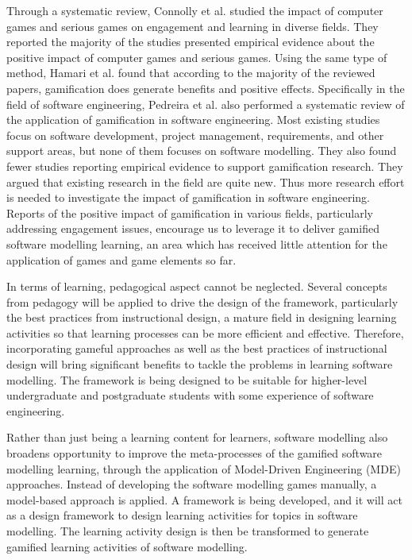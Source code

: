 \documentclass[12pt, a4paper]{report} \usepackage[titletoc]{appendix}
\begin{document}
Through a systematic review, Connolly et al. \cite{connolly2012systematic} studied the impact of computer games and serious games on engagement and learning in diverse fields. They reported the majority of the studies presented empirical evidence about the positive impact of computer games and serious games. Using the same type of method, Hamari et al. \cite{hamari2014does} found that according to the majority of the reviewed papers, gamification does generate benefits and positive effects. Specifically in the field of software engineering, Pedreira et al. \cite{Pedreira2015} also performed a systematic review of the application of gamification in software engineering. Most existing studies focus on software development, project management, requirements, and other support areas, but none of them focuses on software modelling. They also found fewer studies reporting empirical evidence to support gamification research. They argued that existing research in the field are quite new. Thus more research effort is needed to investigate the impact of gamification in software engineering. Reports of the positive impact of gamification in various fields, particularly addressing engagement issues, encourage us to leverage it to deliver gamified software modelling learning, an area which has received little attention for the application of games and game elements so far. 

In terms of learning, pedagogical aspect cannot be neglected. Several concepts from pedagogy will be applied to drive the design of the framework, particularly the best practices from instructional design, a mature field in designing learning activities so that learning processes can be more efficient and effective. Therefore, incorporating gameful approaches as well as the best practices of instructional design will bring significant benefits to tackle the problems in learning software modelling. The framework is being designed to be suitable for higher-level undergraduate and postgraduate students with some experience of software engineering. 

Rather than just being a learning content for learners, software modelling also broadens opportunity to improve the meta-processes of the gamified software modelling learning, through the application of Model-Driven Engineering (MDE) approaches. Instead of developing the software modelling games manually, a model-based approach is applied. A framework is being developed, and it will act as a design framework to design learning activities for topics in software modelling. The learning activity design is then be transformed to generate gamified learning activities of software modelling. 
\end{document}
